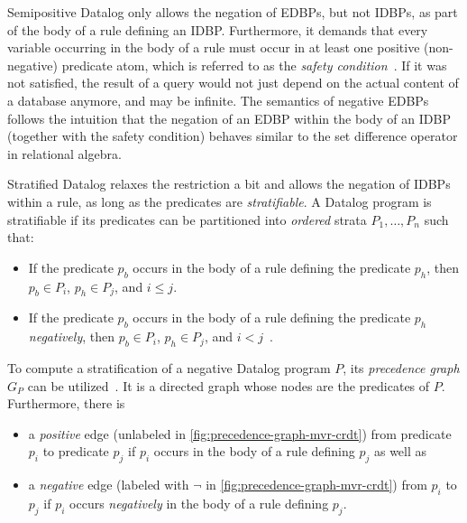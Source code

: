 
Semipositive Datalog only allows the negation of \acp{EDBP}, but not \acp{IDBP},
as part of the body of a rule defining an \ac{IDBP}.
Furthermore, it demands that every variable occurring in the body of a rule must
occur in at least one positive (non-negative) predicate atom,
which is referred to as the \emph{safety condition}~\cite{green2013datalog}.
If it was not satisfied, the result of a query would not just depend on the
actual content of a database anymore, and may be infinite.
The semantics of negative \acp{EDBP} follows the intuition that
the negation of an \ac{EDBP} within the body of an \ac{IDBP} (together with
the safety condition) behaves similar to the set difference operator
in relational algebra.

Stratified Datalog relaxes the restriction a bit and allows the
negation of \acp{IDBP} within a rule, as long as the predicates
are \emph{stratifiable}.
A Datalog program is stratifiable if its predicates can be partitioned into
\emph{ordered} strata \(P_1, \ldots, P_n\) such that:

\begin{itemize}
	\item If the predicate \(p_b\) occurs in the body of a rule defining
	      the predicate \(p_h\), then \(p_b \in P_i\), \(p_h \in P_j\), and
	      \(i \leq j\).
	\item If the predicate \(p_b\) occurs in the body of a rule defining
	      the predicate \(p_h\) \emph{negatively}, then \(p_b \in P_i\),
	      \(p_h \in P_j\), and \(i < j\)~\cite{green2013datalog}.
\end{itemize}

To compute a stratification of a negative Datalog program \(P\),
its \emph{precedence graph} \(G_P\) can be utilized~\cite{green2013datalog}.
It is a directed graph whose nodes are the predicates of \(P\).
Furthermore, there is

\begin{itemize}
	\item a \emph{positive} edge
	      (unlabeled in \ref{fig:precedence-graph-mvr-crdt})
	      from predicate \(p_i\) to predicate \(p_j\)
	      if \(p_i\) occurs in the body of a rule defining \(p_j\) as well as
	\item a \emph{negative} edge
	      (labeled with \(\lnot\) in \ref{fig:precedence-graph-mvr-crdt})
	      from \(p_i\) to \(p_j\)
	      if \(p_i\) occurs \emph{negatively} in the body of a rule defining \(p_j\).
\end{itemize}

